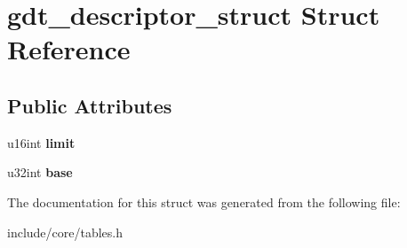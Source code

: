 \hypertarget{structgdt__descriptor__struct}{}\section{gdt\+\_\+descriptor\+\_\+struct Struct Reference}
\label{structgdt__descriptor__struct}
\subsection*{Public Attributes}
\begin{DoxyCompactItemize}
\item 
u16int {\bfseries limit}\hypertarget{structgdt__descriptor__struct_a3c8ae013805dd982b25f0d62e3cdee0e}{}\label{structgdt__descriptor__struct_a3c8ae013805dd982b25f0d62e3cdee0e}

\item 
u32int {\bfseries base}\hypertarget{structgdt__descriptor__struct_aa47407e7b435c214d0cdd22cb66f0e71}{}\label{structgdt__descriptor__struct_aa47407e7b435c214d0cdd22cb66f0e71}

\end{DoxyCompactItemize}


The documentation for this struct was generated from the following file\+:\begin{DoxyCompactItemize}
\item 
include/core/tables.\+h\end{DoxyCompactItemize}
